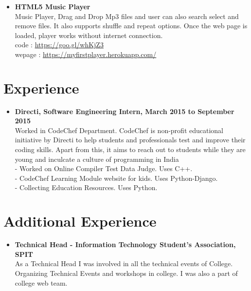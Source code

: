 \documentclass[margin,line]{res}
\begin{document}
\begin{resume}
\begin{itemize}
\item\textbf{HTML5 Music Player}\\
Music Player, Drag and Drop Mp3 files and user can also search select and remove files. It also supports shuffle and repeat options. Once the web page is loaded, player works without internet connection.\\
code : \url{https://goo.gl/whKjZ3}\\ 
wepage : \url{https://myfirstplayer.herokuapp.com/}\\

\end{itemize}



\section{Experience}
\begin{itemize} \itemsep -4pt

\item\textbf{Directi, Software Engineering Intern, March 2015 to September 2015}\\
Worked in CodeChef Department. CodeChef is non-profit educational initiative by Directi to help students and professionals test and improve their coding skills. Apart from this, it aims to reach out to students while they are young and inculcate a culture of programming in India\\
- Worked on Online Compiler Test Data Judge. Uses C++. \\
- CodeChef Learning Module website for kids. Uses Python-Django.\\
- Collecting Education Resources. Uses Python.

\end{itemize}

\section{Additional Experience}
\begin{itemize} \itemsep -4pt
 \item\textbf{Technical Head - Information Technology Student's Association, SPIT }\\
As a Technical Head I was involved in all the technical events of College. Organizing Technical Events and workshops in college. I was also a part of college web team.\\


\end{itemize}
\end{resume}
\end{document}
